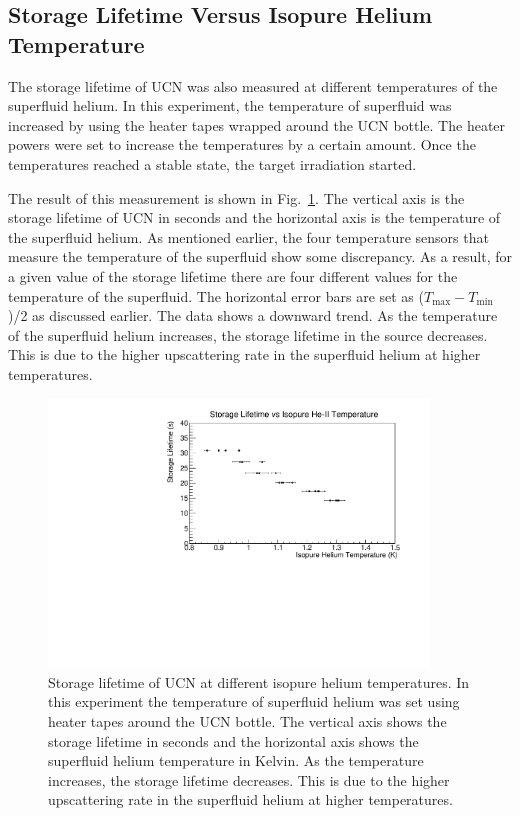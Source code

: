 \subsection{Storage Lifetime Versus Isopure Helium Temperature}
The storage lifetime of UCN was also measured at different
temperatures of the superfluid helium. In this experiment, the
temperature of superfluid was increased by using the heater tapes
wrapped around the UCN bottle. The heater powers were set to increase
the temperatures by a certain amount. Once the temperatures reached a
stable state, the target irradiation started.

The result of this measurement is shown in
Fig.~\ref{fig:storagelifetime_vs_temp}. The vertical axis is the
storage lifetime of UCN in seconds and the horizontal axis is the
temperature of the superfluid helium. As mentioned earlier, the four
temperature sensors that measure the temperature of the superfluid
show some discrepancy. As a result, for a given value of the storage
lifetime there are four different values for the temperature of the
superfluid. The horizontal error bars are set as
($T_{\mathrm{max}} - T_{\mathrm{min}}$)/2 as discussed earlier. The
data shows a downward trend. As the temperature of the superfluid
helium increases, the storage lifetime in the source decreases. This
is due to the higher upscattering rate in the superfluid helium at
higher temperatures.


\begin{figure}[h!]
  \centering
  \includegraphics[width=0.9\textwidth]{StorageLifetime_vs_temp.pdf}
  \caption{Storage lifetime of UCN at different isopure helium
    temperatures. In this experiment the temperature of superfluid
    helium was set using heater tapes around the UCN bottle. The
    vertical axis shows the storage lifetime in seconds and the
    horizontal axis shows the superfluid helium temperature in
    Kelvin. As the temperature increases, the storage lifetime
    decreases. This is due to the higher upscattering rate in the
    superfluid helium at higher temperatures.}
  \label{fig:storagelifetime_vs_temp}
\end{figure}


